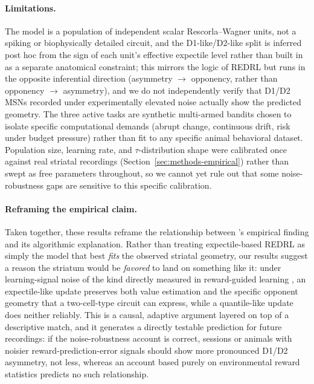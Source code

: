 \documentclass[11pt]{article}
\begin{document}
\paragraph{Limitations.} The model is a population of independent scalar Rescorla--Wagner units, not a spiking or biophysically detailed circuit, and the D1-like/D2-like split is inferred post hoc from the sign of each unit's effective expectile level rather than built in as a separate anatomical constraint; this mirrors the logic of REDRL \citep{lowet2025} but runs in the opposite inferential direction (asymmetry $\to$ opponency, rather than opponency $\to$ asymmetry), and we do not independently verify that D1/D2 MSNs recorded under experimentally elevated noise actually show the predicted geometry. The three active tasks are synthetic multi-armed bandits chosen to isolate specific computational demands (abrupt change, continuous drift, risk under budget pressure) rather than fit to any specific animal behavioral dataset. Population size, learning rate, and $\tau$-distribution shape were calibrated once against real striatal recordings (Section~\ref{sec:methods-empirical}) rather than swept as free parameters throughout, so we cannot yet rule out that some noise-robustness gaps are sensitive to this specific calibration.

\paragraph{Reframing the empirical claim.} Taken together, these results reframe the relationship between \citet{lowet2025}'s empirical finding and its algorithmic explanation. Rather than treating expectile-based REDRL as simply the model that best \emph{fits} the observed striatal geometry, our results suggest a reason the striatum would be \emph{favored} to land on something like it: under learning-signal noise of the kind directly measured in reward-guided learning \citep{findling2019}, an expectile-like update preserves both value estimation and the specific opponent geometry that a two-cell-type circuit can express, while a quantile-like update does neither reliably. This is a causal, adaptive argument layered on top of a descriptive match, and it generates a directly testable prediction for future recordings: if the noise-robustness account is correct, sessions or animals with noisier reward-prediction-error signals should show more pronounced D1/D2 asymmetry, not less, whereas an account based purely on environmental reward statistics predicts no such relationship.



\end{document}
